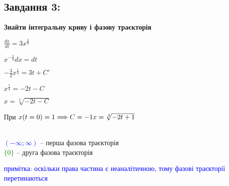 \subsection{Завдання 3:}

\textbf{Знайти інтегральну криву і фазову траєкторія}

\begin{minipage}{0.49\textwidth}
    $\frac{dx}{dt} = 3x^{\frac{2}{3}}$

    $x^{-\frac{2}{3}}dx = dt$

    $-\frac{3}{2}x^{\frac{1}{3}} = 3t + C'$

    $x^{\frac{1}{3}} = -2t - C$

    $x = \sqrt[3]{-2t - C}$

    При $x(t = 0) = 1 \Longrightarrow C = -1\\
    x = \sqrt[3]{-2t + 1}$

\end{minipage}
\begin{minipage}{0.49\textwidth}
    \centering \resizebox*{7cm}{7cm}{}\\
    \textcolor{blue}{$(-\infty;\infty)$} -- перша фазова траєкторія\\
    \textcolor{green}{$\{0\}$} -- друга фазова траєкторія
\end{minipage}

\textcolor{blue}{примітка: оскільки права частина є неаналітичною, тому фазові траєкторії перетинаються}